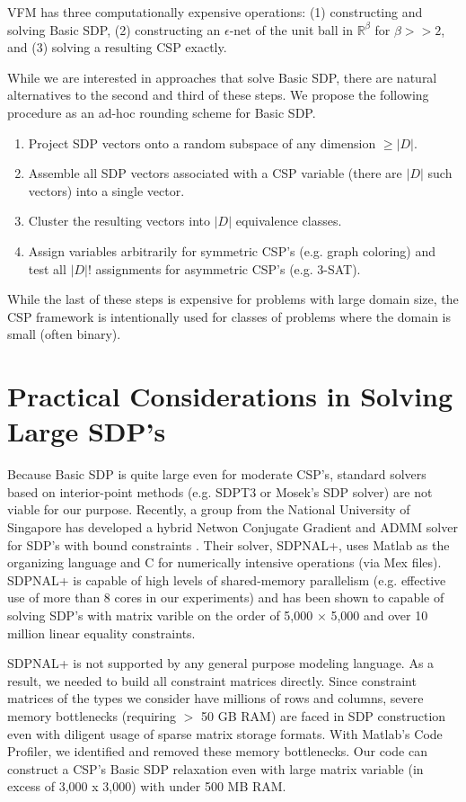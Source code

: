 \documentclass[12pt]{article} %
\begin{document}
VFM has three computationally expensive operations: (1) constructing and solving Basic SDP, (2) constructing an $\epsilon$-net of the unit ball in $\mathbb{R}^\beta$ for $\beta>>2$, and (3) solving a resulting CSP exactly.

While we are interested in approaches that solve Basic SDP, there are natural alternatives to the second and third of these steps. We propose the following procedure as an ad-hoc rounding scheme for Basic SDP.
\begin{enumerate}
\item Project SDP vectors onto a random subspace of any dimension $\geq |D|$.
\item Assemble all SDP vectors associated with a CSP variable (there are $|D|$ such vectors) into a single vector.
\item Cluster the resulting vectors into $|D|$ equivalence classes.
\item Assign variables arbitrarily for symmetric CSP's (e.g. graph coloring) and test all $|D|!$ assignments for asymmetric CSP's (e.g. 3-SAT).
\end{enumerate}

While the last of these steps is expensive for problems with large domain size, the CSP framework is intentionally used for classes of problems where the domain is small (often binary).

\section{Practical Considerations in Solving Large SDP's}

Because Basic SDP is quite large even for moderate CSP's, standard solvers based on interior-point methods (e.g. SDPT3 or Mosek's SDP solver) are not viable for our purpose. Recently, a group from the National University of Singapore has developed a hybrid Netwon Conjugate Gradient and ADMM solver for SDP's with bound constraints \cite{yang2015sdpnal+, zhao2010newton}. Their solver, SDPNAL+, uses Matlab as the organizing language and C for numerically intensive operations (via Mex files). SDPNAL+ is capable of high levels of shared-memory parallelism (e.g. effective use of more than 8 cores in our experiments) and has been shown to capable of solving SDP's with matrix varible on the order of 5,000 $\times$ 5,000 and over 10 million linear equality constraints.

SDPNAL+ is not supported by any general purpose modeling language. As a result, we needed to build all constraint matrices directly. Since constraint matrices of the types we consider have millions of rows and columns, severe memory bottlenecks (requiring $>$ 50 GB RAM) are faced in SDP construction even with diligent usage of sparse matrix storage formats. With Matlab's Code Profiler, we identified and removed these memory bottlenecks. Our code can construct a CSP's Basic SDP relaxation even with large matrix variable (in excess of 3,000 x 3,000) with under 500 MB RAM. 
\end{document}
